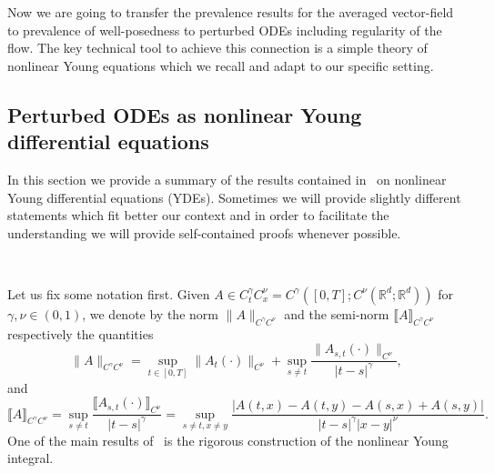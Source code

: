 \documentclass[10pt]{article}
\begin{document}
Now we are going to transfer the prevalence results for the averaged
vector-field to prevalence of well-posedness to perturbed ODEs including
regularity of the flow. The key technical tool to achieve this connection is a
simple theory of nonlinear Young equations which we recall and adapt to our
specific setting.

\subsection{Perturbed ODEs as nonlinear Young differential
equations}\label{sec4.1}

In this section we provide a summary of the results contained
in~{\cite{catelliergubinelli}} on nonlinear Young differential equations
(YDEs). Sometimes we will provide slightly different statements which fit
better our context and in order to facilitate the understanding we will
provide self-contained proofs whenever possible.

\

Let us fix some notation first. Given $A \in C^{\gamma}_t C^{\nu}_x =
C^{\gamma} ([0, T] ; C^{\nu} (\mathbb{R}^d ; \mathbb{R}^d))$ for $\gamma, \nu
\in (0, 1)$, we denote by the norm $\| A \|_{C^{\gamma} C^{\nu}}$ and the
semi-norm $\llbracket A \rrbracket_{C^{\gamma} C^{\nu}}$ respectively the
quantities
\[ \| A \|_{C^{\gamma} C^{\nu}} = \sup_{t \in [0, T]} \| A_t (\cdot)
   \|_{C^{\nu}} + \sup_{s \neq t} \frac{\| A_{s, t} (\cdot) \|_{C^{\nu}}}{| t
   - s |^{\gamma}}, \]
and
\[ \llbracket A \rrbracket_{C^{\gamma} C^{\nu}} = \sup_{s \neq t}
   \frac{\llbracket A_{s, t} (\cdot) \rrbracket_{C^{\nu}}}{| t - s |^{\gamma}}
   = \sup_{s \neq t, x \neq y} \frac{| A (t, x) - A (t, y) - A (s, x) + A (s,
   y) |}{| t - s |^{\gamma}  | x - y |^{\nu}} . \]
One of the main results of~{\cite{catelliergubinelli}} is the rigorous
construction of the nonlinear Young integral.
\end{document}
